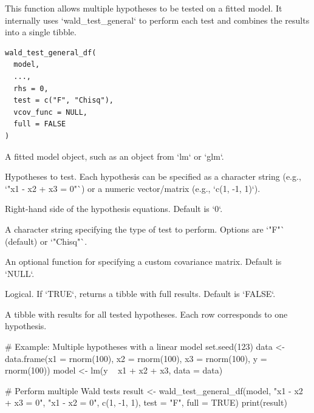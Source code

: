 \documentclass[a4paper]{book}
\begin{document}
%
\begin{Description}
This function allows multiple hypotheses to be tested on a fitted model. It internally
uses `wald\_test\_general` to perform each test and combines the results into a single
tibble.
\end{Description}
%
\begin{Usage}
\begin{verbatim}
wald_test_general_df(
  model,
  ...,
  rhs = 0,
  test = c("F", "Chisq"),
  vcov_func = NULL,
  full = FALSE
)
\end{verbatim}
\end{Usage}
%
\begin{Arguments}
\begin{ldescription}
\item[\code{model}] A fitted model object, such as an object from `lm` or `glm`.

\item[\code{...}] Hypotheses to test. Each hypothesis can be specified as a character string
(e.g., `"x1 - x2 + x3 = 0"`) or a numeric vector/matrix (e.g., `c(1, -1, 1)`).

\item[\code{rhs}] Right-hand side of the hypothesis equations. Default is `0`.

\item[\code{test}] A character string specifying the type of test to perform. Options are `"F"`
(default) or `"Chisq"`.

\item[\code{vcov\_func}] An optional function for specifying a custom covariance matrix. Default is `NULL`.

\item[\code{full}] Logical. If `TRUE`, returns a tibble with full results. Default is `FALSE`.
\end{ldescription}
\end{Arguments}
%
\begin{Value}
A tibble with results for all tested hypotheses. Each row corresponds to one hypothesis.
\end{Value}
%
\begin{Examples}
\begin{ExampleCode}
# Example: Multiple hypotheses with a linear model
set.seed(123)
data <- data.frame(x1 = rnorm(100), x2 = rnorm(100), x3 = rnorm(100), y = rnorm(100))
model <- lm(y ~ x1 + x2 + x3, data = data)

# Perform multiple Wald tests
result <- wald_test_general_df(model, "x1 - x2 + x3 = 0", "x1 - x2 = 0", c(1, -1, 1), test = "F", full = TRUE)
print(result)

\end{ExampleCode}
\end{Examples}
\end{document}
